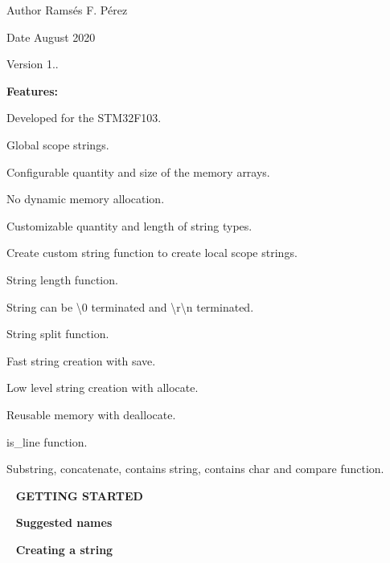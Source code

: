 \begin{DoxyAuthor}{Author}
Ramsés F. Pérez 
\end{DoxyAuthor}
\begin{DoxyDate}{Date}
August 2020 
\end{DoxyDate}
\begin{DoxyVersion}{Version}
1..
\end{DoxyVersion}
{\bfseries{Features\+:}}


\begin{DoxyItemize}
\item Developed for the S\+T\+M32\+F103.
\item Global scope strings.
\item Configurable quantity and size of the memory arrays.
\item No dynamic memory allocation.
\item Customizable quantity and length of string types.
\item Create custom string function to create local scope strings.
\item String length function.
\item String can be \textbackslash{}0 terminated and \textbackslash{}r\textbackslash{}n terminated.
\item String split function.
\item Fast string creation with save.
\item Low level string creation with allocate.
\item Reusable memory with deallocate.
\item is\+\_\+line function.
\item Substring, concatenate, contains string, contains char and compare function.
\end{DoxyItemize}

~\newline
{\bfseries{G\+E\+T\+T\+I\+NG S\+T\+A\+R\+T\+ED}}

~\newline
{\bfseries{Suggested names}} ~\newline
 
\begin{DoxyCode}{0}
\end{DoxyCode}


~\newline
{\bfseries{Creating a string}} ~\newline
 
